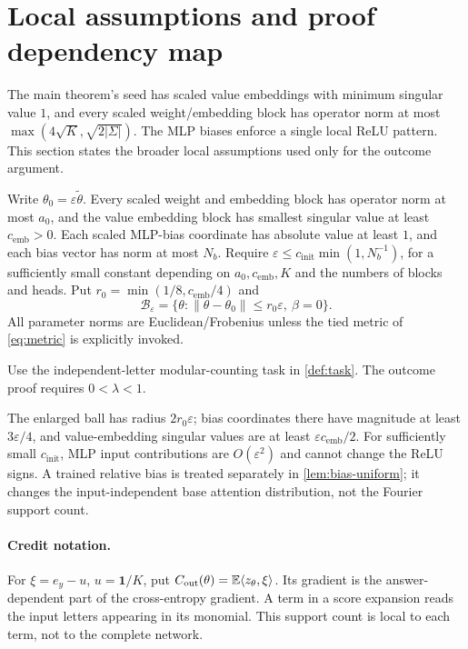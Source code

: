 \providecommand{\reg}[1]{\ensuremath{\mathsf{#1}}}
\section{Local assumptions and proof dependency map}\label{app:formal}
The main theorem's seed has scaled value embeddings with minimum singular value $1$, and every scaled weight/embedding block has operator norm at most $\max(4\sqrt K,\sqrt{2|\Sigma|})$. The MLP biases enforce a single local ReLU pattern. This section states the broader local assumptions used only for the outcome argument.
\begin{assumption}\label{ass:init}
Write $\theta_0=\varepsilon\tilde\theta$. Every scaled weight and embedding block has operator norm at most $a_0$, and the value embedding block has smallest singular value at least $c_{\mathrm{emb}}>0$. Each scaled MLP-bias coordinate has absolute value at least $1$, and each bias vector has norm at most $N_b$. Require $\varepsilon\le c_{\mathrm{init}}\min(1,N_b^{-1})$, for a sufficiently small constant depending on $a_0,c_{\mathrm{emb}},K$ and the numbers of blocks and heads. Put $r_0=\min(1/8,c_{\mathrm{emb}}/4)$ and
\[
\mathcal B_\varepsilon=\{\theta:\|\theta-\theta_0\|\le r_0\varepsilon,\ \beta=0\}.
\]
All parameter norms are Euclidean/Frobenius unless the tied metric of \cref{eq:metric} is explicitly invoked.
\end{assumption}
\begin{assumption}[Task]\label{ass:task}
Use the independent-letter modular-counting task in \cref{def:task}. The outcome proof requires $0<\lambda<1$.
\end{assumption}
The enlarged ball has radius $2r_0\varepsilon$; bias coordinates there have magnitude at least $3\varepsilon/4$, and value-embedding singular values are at least $\varepsilon c_{\mathrm{emb}}/2$. For sufficiently small $c_{\mathrm{init}}$, MLP input contributions are $O(\varepsilon^2)$ and cannot change the ReLU signs. A trained relative bias is treated separately in \cref{lem:bias-uniform}; it changes the input-independent base attention distribution, not the Fourier support count.

\paragraph{Credit notation.}\label{def:credit}
For $\xi=e_y-u$, $u=\mathbf1/K$, put $C_{\mathrm{out}}(\theta)=\mathbb E\langle z_\theta,\xi\rangle$. Its gradient is the answer-dependent part of the cross-entropy gradient. A term in a score expansion reads the input letters appearing in its monomial. This support count is local to each term, not to the complete network.


